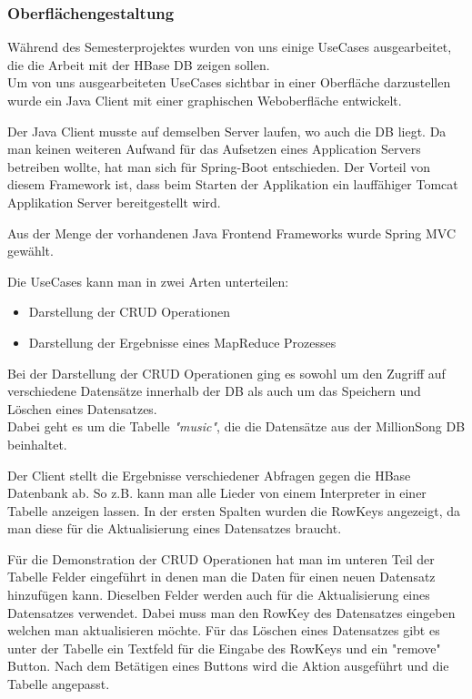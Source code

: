 \subsubsection{Oberflächengestaltung}

Während des Semesterprojektes wurden von uns einige UseCases ausgearbeitet, die die Arbeit mit der HBase DB zeigen sollen.\\
Um von uns ausgearbeiteten UseCases sichtbar in einer Oberfläche darzustellen wurde ein Java Client mit einer graphischen Weboberfläche entwickelt.

Der Java Client musste auf demselben Server laufen, wo auch die DB liegt. Da man keinen weiteren Aufwand für das Aufsetzen eines Application Servers betreiben wollte, hat man sich für Spring-Boot entschieden. Der Vorteil von diesem Framework ist, dass beim Starten der Applikation ein lauffähiger Tomcat Applikation Server bereitgestellt wird. 

Aus der Menge der vorhandenen Java Frontend Frameworks wurde Spring MVC gewählt.  

Die UseCases kann man in zwei Arten unterteilen:\\
\begin{itemize}
\item Darstellung der CRUD Operationen
\item Darstellung der Ergebnisse eines MapReduce Prozesses
\end{itemize}
Bei der Darstellung der CRUD Operationen ging es sowohl um den Zugriff auf verschiedene Datensätze innerhalb der DB als auch um das Speichern und Löschen eines Datensatzes.\\
Dabei geht es um die Tabelle \textit{"music"}, die die Datensätze aus der MillionSong DB beinhaltet.


Der Client stellt die Ergebnisse verschiedener Abfragen gegen die HBase Datenbank ab. So z.B. kann man alle Lieder von einem Interpreter in einer Tabelle anzeigen lassen. In der ersten Spalten wurden die RowKeys angezeigt, da man diese für die Aktualisierung eines Datensatzes braucht.

Für die Demonstration der CRUD Operationen hat man im unteren Teil der Tabelle Felder eingeführt in denen man die Daten für einen neuen Datensatz hinzufügen kann. Dieselben Felder werden auch für die Aktualisierung eines Datensatzes verwendet. Dabei muss man den RowKey des Datensatzes eingeben welchen man aktualisieren möchte.
Für das Löschen eines Datensatzes gibt es unter der Tabelle ein Textfeld für die Eingabe des RowKeys und ein "remove" Button. Nach dem Betätigen eines Buttons wird die Aktion ausgeführt und die Tabelle angepasst.

